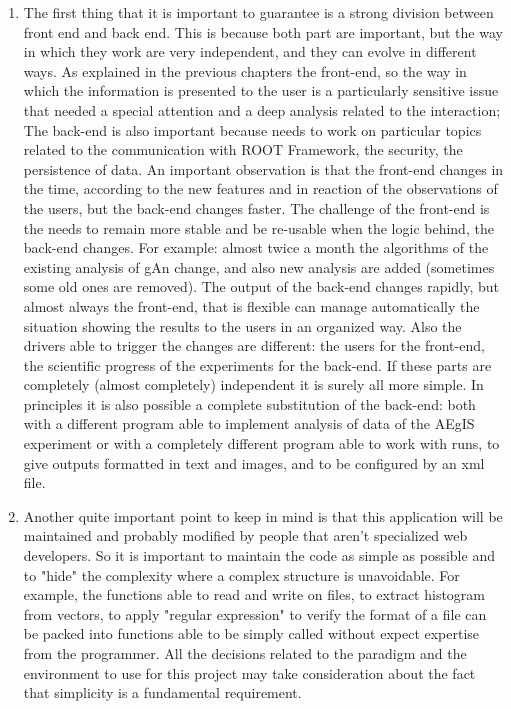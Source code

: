 \begin{enumerate}

\item
The first thing that it is important to guarantee is a strong division between front end and back end. This is because both part are important, but the way in which they work are very independent, and they can evolve in different ways.
As explained in the previous chapters the front-end, so the way in which the information is presented to the user is a particularly sensitive issue that needed a special attention and a deep analysis related to the interaction; The back-end is also important because needs to work on particular topics related to the communication with ROOT Framework, the security, the persistence of data. An important observation is that the front-end changes in the time, according to the new features and in reaction of the observations of the users, but the back-end changes faster. The challenge of the front-end is the needs to remain more stable and be re-usable when the logic behind, the back-end changes. For example: almost twice a month the algorithms of the existing analysis of gAn change, and also new analysis are added (sometimes some old ones are removed). The output of the back-end changes rapidly, but almost always the front-end, that is flexible can manage automatically the situation showing the results to the users in an organized way. Also the drivers able to trigger the changes are different: the users for the front-end, the scientific progress of the experiments for the back-end. If these parts are completely (almost completely) independent it is surely all more simple. In principles it is also possible a complete substitution of the back-end: both with a different program able to implement analysis of data of the AEgIS experiment or with a completely different program able to work with runs, to give outputs formatted in text and images, and to be configured by an xml file.

\item
Another quite important point to keep in mind is that this application will be maintained and probably modified by people that aren't specialized web developers. So it is important to maintain the code as simple as possible and to "hide" the complexity where a complex structure is unavoidable. For example, the functions able to read and write on files, to extract histogram from vectors, to apply "regular expression" to verify the format of a file can be packed into functions able to be simply called without expect expertise from the programmer. All the decisions related to the paradigm and the environment to use for this project may take consideration about the fact that simplicity is a fundamental requirement.   


\end{enumerate}
